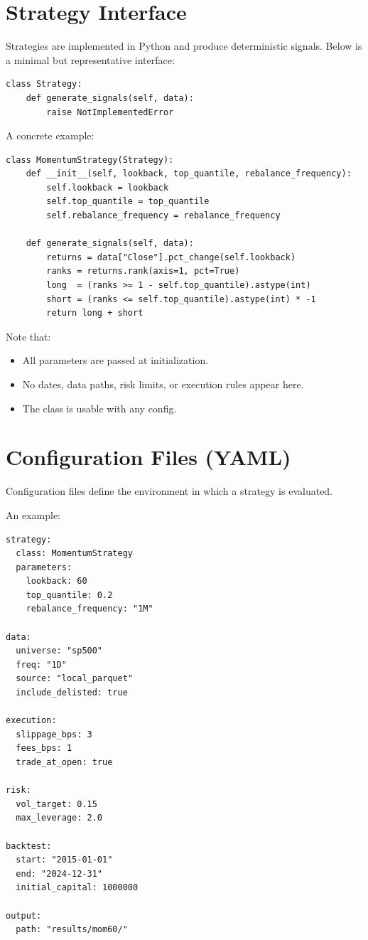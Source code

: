 \documentclass[11pt]{article}
\begin{document}
\section{Strategy Interface}

Strategies are implemented in Python and produce deterministic signals.
Below is a minimal but representative interface:

\begin{verbatim}
class Strategy:
    def generate_signals(self, data):
        raise NotImplementedError
\end{verbatim}

A concrete example:

\begin{verbatim}
class MomentumStrategy(Strategy):
    def __init__(self, lookback, top_quantile, rebalance_frequency):
        self.lookback = lookback
        self.top_quantile = top_quantile
        self.rebalance_frequency = rebalance_frequency

    def generate_signals(self, data):
        returns = data["Close"].pct_change(self.lookback)
        ranks = returns.rank(axis=1, pct=True)
        long  = (ranks >= 1 - self.top_quantile).astype(int)
        short = (ranks <= self.top_quantile).astype(int) * -1
        return long + short
\end{verbatim}

Note that:
\begin{itemize}
    \item All parameters are passed at initialization.
    \item No dates, data paths, risk limits, or execution rules appear here.
    \item The class is usable with any config.
\end{itemize}

\section{Configuration Files (YAML)}

Configuration files define the environment in which a strategy is evaluated.

An example:

\begin{verbatim}
strategy:
  class: MomentumStrategy
  parameters:
    lookback: 60
    top_quantile: 0.2
    rebalance_frequency: "1M"

data:
  universe: "sp500"
  freq: "1D"
  source: "local_parquet"
  include_delisted: true

execution:
  slippage_bps: 3
  fees_bps: 1
  trade_at_open: true

risk:
  vol_target: 0.15
  max_leverage: 2.0

backtest:
  start: "2015-01-01"
  end: "2024-12-31"
  initial_capital: 1000000

output:
  path: "results/mom60/"
\end{verbatim}
\end{document}
